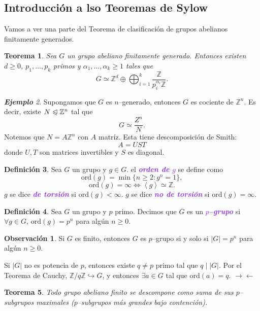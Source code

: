 \documentclass{article}
\newtheorem{theorem}{Teorema}[subsection]
\theoremstyle{definition}
\newtheorem{definition}[theorem]{Definición}
\newtheorem*{obs}{Observación}
\theoremstyle{remark}
\newtheorem{example}[theorem]{\textbf{Ejemplo}}
\numberwithin{equation}{section}
\newcommand{\Z}{\mathbb{Z}}
\newcommand{\oo}{\infty}
\newcommand{\embed}{\hookrightarrow}
\newcommand{\normal}{\trianglelefteqslant}
\newcommand{\ord}{\mathrm{ord}}
\newcommand{\abs}[1]{\left| #1 \right|}
\newcommand{\gen}[1]{\left\langle #1 \right\rangle}
\newcommand{\znz}[1]{\frac{\Z}{#1 \Z}}
\newcommand{\zmz}[1]{\Z/ #1 \Z}
\newcommand{\wea}[1]{\textcolor{BlueViolet}{\textbf{\emph{#1}}}}
\begin{document}
\newpage
\subsection{Introducción a lso Teoremas de Sylow}

Vamos a ver una parte del Teorema de clasificación de grupos abelianos finitamente generados.

\begin{theorem}
  Sea $G$ un grupo abeliano finitamente generado. Entonces existen $d \geq 0$, $p_1,\dots, p_k$ primos y $\alpha_1, \dots, \alpha_k \geq 1$ tales que
  \[G \simeq \Z^d \oplus \bigoplus_{i=1}^k \znz{p_i^{\alpha_i}}.\]
\end{theorem}

\begin{example}
  Supongamos que $G$ es $n$--generado, entonces $G$ es cociente de $\Z^n$. Es decir, existe $N \normal \Z^n$ tal que
  \[G \simeq \frac{Z^n}{N}.\]
  Notemos que $N = A \Z^n$ con $A$ matríz. Esta tiene descomposición de Smith:
  \[A = UST\]
  donde $U,T$ son matrices invertibles y $S$ es diagonal.
\end{example}

\begin{definition}
  Sea $G$ un grupo y $g \in G$. el \wea{orden de $g$} se define como
  \[\ord(g) = \min\{n \geq 2 : g^n = 1\},\]
  \[\ord(g) = \oo \iff \gen{g} \simeq \Z.\]
  $g$ se dice \wea{de torsión} si $\ord(g) < \oo$.
  $g$ se dice \wea{no de torsión} si $\ord(g) = \oo$.
\end{definition}

\begin{definition}
  Sea $G$ un grupo y $p$ primo. Decimos que $G$ es un \wea{$p$--grupo} si $\forall g \in G$, $\ord(g) = p^n$ para algún $n \geq 0$.
\end{definition}

\begin{obs}
  Si $G$ es finito, entonces $G$ es $p$--grupo si y solo si $\abs G = p^n$ para algún $n \geq 0$.

  Si $\abs G$ no es potencia de $p$, entonces existe $q \neq p$ primo tal que $q \mid \abs G$. Por el Teorema de Cauchy, $\zmz q \embed G$, y entonces $\exists a \in G$ tal que $\ord(a) = q$. $\to\gets$
\end{obs}

\begin{theorem}
  Todo grupo abeliano finito se descompone como suma de sus $p$--subgrupos maximales ($p$--subgrupos más grandes bajo contención).
\end{theorem}
\end{document}
